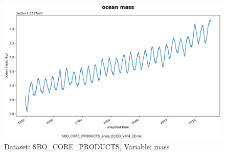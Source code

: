 \begin{figure}[H]
\centering
\includegraphics[scale=0.55]{../images/plots/oneD_plots/SBO_Core_Products/mass.png}
\caption{Dataset: SBO\_CORE\_PRODUCTS, Variable: mass}
\label{tab:table-SBO_CORE_PRODUCTS_mass-Plot}
\end{figure}
\pagebreak
